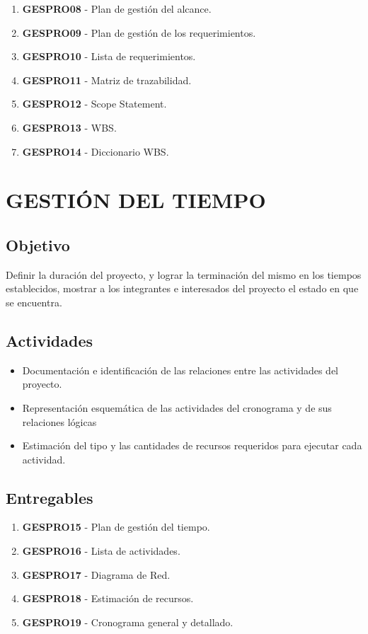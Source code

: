 \begin{enumerate}
	\item \textbf{GESPRO08} - Plan de gesti\'on del alcance.
	\item \textbf{GESPRO09} - Plan de gesti\'on de los requerimientos.
	\item \textbf{GESPRO10} - Lista de requerimientos.
	\item \textbf{GESPRO11} - Matriz de trazabilidad.
	\item \textbf{GESPRO12} - Scope Statement.
	\item \textbf{GESPRO13} - WBS.
	\item \textbf{GESPRO14} - Diccionario WBS.
\end{enumerate}

\chapter{GESTI\'ON DEL TIEMPO}

\section{Objetivo}
Definir la duraci\'on del proyecto, y lograr la terminaci\'on del mismo en los tiempos establecidos, 
mostrar a los integrantes e interesados del  proyecto el estado en que se encuentra.%
%
\section{Actividades}
\begin{itemize}
	\item Documentaci\'on e identificaci\'on de las relaciones entre las actividades del proyecto.
	
	\item Representaci\'on esquem\'atica de las actividades del cronograma y de sus relaciones l\'ogicas
	
	\item Estimaci\'on del tipo y las cantidades de recursos requeridos para ejecutar cada actividad.
	
\end{itemize}
%
\section{Entregables}

\begin{enumerate}
	\item \textbf{GESPRO15} - Plan de gesti\'on del tiempo.
	\item \textbf{GESPRO16} - Lista de actividades.
	\item \textbf{GESPRO17} - Diagrama de Red.
	\item \textbf{GESPRO18} - Estimaci\'on de recursos.
	\item \textbf{GESPRO19} - Cronograma general y detallado.
\end{enumerate}

